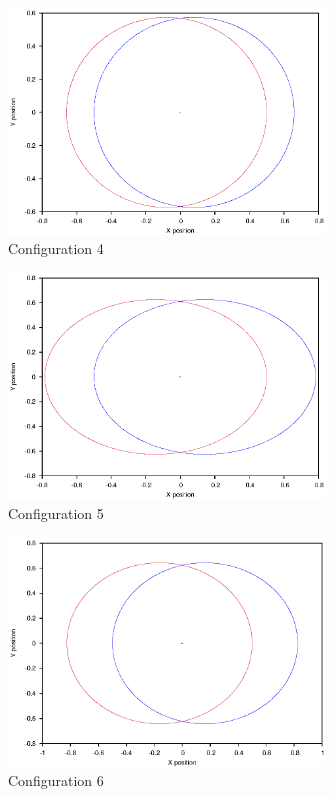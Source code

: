 \documentclass[a4paper,12pt]{article}
\begin{document}
\begin{figure}[H]
\centering
\includegraphics[width=0.75\textwidth]{./results/004-55-004/Orbit.eps}
\caption{Configuration 4}
\label{fig:config4}
\end{figure}
\begin{figure}[H]
\centering
\includegraphics[width=0.75\textwidth]{./results/004-57-004/Orbit.eps}
\caption{Configuration 5}
\label{fig:config5}
\end{figure}
\begin{figure}[H]
\centering
\includegraphics[width=0.75\textwidth]{./results/005-58-005-3/Orbit.eps}
\caption{Configuration 6}
\label{fig:config6}
\end{figure}
\end{document}
